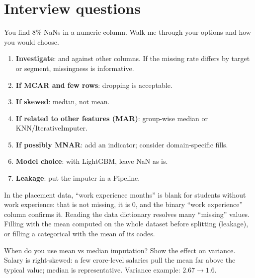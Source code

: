 \section{Interview questions}

\begin{qa}{ You find 8\% NaNs in a numeric column. Walk me through your options and how
you would choose.}
\why
\begin{enumerate}
\item \textbf{Investigate}:  and against other columns. If the missing rate differs by target
  or segment, missingness is informative.
\item \textbf{If MCAR and few rows}: dropping is acceptable.
\item \textbf{If skewed}: median, not mean.
\item \textbf{If related to other features (MAR)}: group-wise median or KNN/IterativeImputer.
\item \textbf{If possibly MNAR}: add an indicator; consider domain-specific fills.
\item \textbf{Model choice}: with LightGBM, leave NaN as is.
\item \textbf{Leakage}: put the imputer in a Pipeline.
\end{enumerate}
\worked In the placement data, ``work experience months'' is blank for students without work experience: that is not missing, it is 0, and the
binary ``work experience'' column confirms it. Reading the data dictionary resolves many ``missing'' values.
\pitfall Filling with the mean computed on the whole dataset before splitting (leakage), or filling a categorical with the mean of its codes.
\end{qa}

\begin{qa}{ When do you use mean vs median imputation? Show the effect on variance.}
\why Salary is right-skewed: a few crore-level salaries pull the mean far above the typical value; median is representative. Variance
example: $2.67\to1.6$.
\end{qa}

